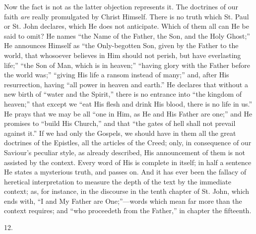 Now the fact is not as the latter objection represents it. The
doctrines of our faith \emph{are} really promulgated by Christ Himself. There
is no truth which St. Paul or St. John declares, which He does not
anticipate. Which of them all can He be said to omit? He names
``the Name of the Father, the Son, and the Holy Ghost;'' He
announces Himself as ``the Only-begotten Son, given by the Father
to the world, that whosoever believes in Him should not perish, but
have everlasting life;'' ``the Son of Man, which is in
heaven;'' ``having glory with the Father before the world
was;'' ``giving His life a ransom instead of many;'' and,
after His resurrection, having ``all power in heaven and
earth.'' He declares that without a new birth of ``water and
the Spirit,'' there is no entrance into ``the kingdom of
heaven;'' that except we ``eat His flesh and drink His blood,
there is no life in us.'' He prays that we may be all ``one in
Him, as He and His Father are one;'' and He promises to
``build His Church,'' and that ``the gates of hell shall
not prevail against it.'' If we had only the Gospels, we should
have in them all the great doctrines of the Epistles, all the articles
of the Creed; only, in consequence of our Saviour's peculiar style, as
already described, His announcement of them is not assisted by the
context. Every word of His is complete in itself; in half a
sentence He states a mysterious truth, and passes on. And it has ever
been the fallacy of heretical interpretation to measure the depth of
the text by the immediate context; as, for instance, in the discourse
in the tenth chapter of St. John, which ends with, ``I and My
Father are One;''—words which mean far more than the context
requires; and ``who proceedeth from the Father,'' in chapter
the fifteenth.

12.


